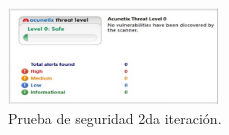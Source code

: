 \begin{figure}[htbp] %
	\centering
	\includegraphics[width=0.5\textwidth]{images/2iter.PNG} 
	\caption{ Prueba de seguridad 2da iteración.}
	\label{fig:grafica_segu2}
\end{figure}




